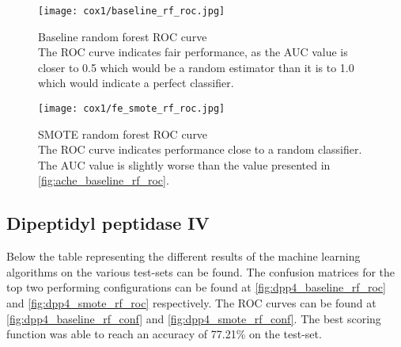 \begin{figure}[H]
    \begin{center}
        \captionsetup{justification=centering}
        \texttt{[image: cox1/baseline\_rf\_roc.jpg]}
        \caption[]{Baseline random forest ROC curve\\
            The ROC curve indicates fair performance, as the AUC value is closer to 0.5 which would be a random estimator than it is to 1.0 which would indicate a perfect classifier.
        }
        \label{fig:cox1_baseline_rf_roc}
    \end{center}

\end{figure}

\begin{figure}[H]
    \begin{center}
        \captionsetup{justification=centering}
        \texttt{[image: cox1/fe\_smote\_rf\_roc.jpg]}
        \caption[]{SMOTE random forest ROC curve\\
            The ROC curve indicates performance close to a random classifier. The AUC value is slightly worse than the value presented in \ref*{fig:ache_baseline_rf_roc}.
        }
        \label{fig:cox1_smote_rf_roc}
    \end{center}
\end{figure}

\subsection{Dipeptidyl peptidase IV}
Below the table representing the different results of the machine learning algorithms on the various test-sets can be found.
The confusion matrices for the top two performing configurations can be found at \ref{fig:dpp4_baseline_rf_roc} and \ref{fig:dpp4_smote_rf_roc}
respectively. The ROC curves can be found at \ref{fig:dpp4_baseline_rf_conf} and \ref{fig:dpp4_smote_rf_conf}.
The best scoring function was able to reach an accuracy of 77.21\% on the test-set.


